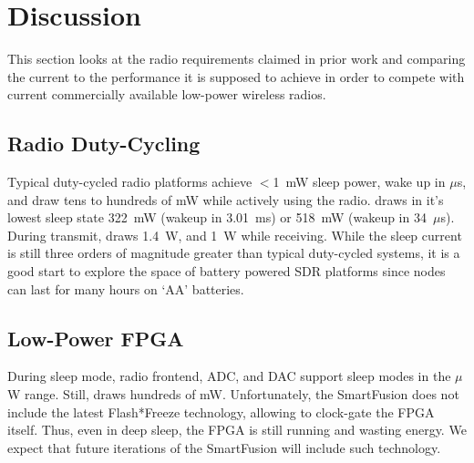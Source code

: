\section{Discussion}
\label{sec:disc}
\begin{comment}
We built \sdr with the intention to see how close we can get to the claims
presented in~\cite{dutta-low-cal}. This section will look at the four
different requirements {\em Radio Duty-Cycling}, \emph{Low-Power FPGA},
\emph{System Integration}, and \emph{Measurement} and compare the current \sdr
platform to the performance it is supposed to achieve in order to compete with
current commercially available low-power wireless radios.
\end{comment}

This section looks at the radio requirements claimed in prior work
and comparing the current \sdr
to the performance it is supposed to achieve in order to compete with
current commercially available low-power wireless radios.

\subsection{Radio Duty-Cycling}

Typical duty-cycled radio platforms achieve $<$1~mW sleep power, wake up in
$\mu$s, and draw tens to hundreds of mW while actively using the radio. \sdr
draws in it's lowest sleep state 322~mW (wakeup in 3.01~ms) or 518~mW (wakeup in
34~$\mu$s). During transmit, \sdr draws 1.4~W, and 1~W while receiving.
While the sleep current is still three orders of magnitude greater than typical
duty-cycled systems, it is a good start to explore the space of battery
powered SDR platforms since nodes can last for many hours on `AA' batteries. 

\begin{comment}
Comparing this to an iPhone~4S which has a battery
capacity of 5.3~Whr, we can power \sdr for 3.8~hours while constantly
transmitting, or 16.4~hours in deep sleep. Thus, using a moderate amount of
duty-cycling, a 12~hour deployment time could easily be achieved.
\end{comment}

\subsection{Low-Power FPGA}

During sleep mode, radio frontend,
ADC, and DAC support sleep modes in the $\mu$W range.
Still, \sdr draws hundreds of mW. Unfortunately, the SmartFusion
does not include the latest Flash*Freeze technology, allowing to clock-gate
the FPGA itself. Thus, even in deep sleep, the FPGA is still running and
wasting energy. We expect that future iterations of the SmartFusion will
include such technology.

